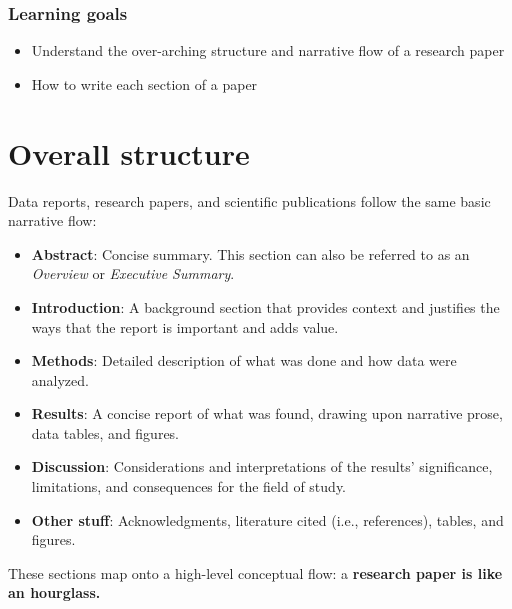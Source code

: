 \documentclass[]{book}
\providecommand{\tightlist}{%
  \setlength{\itemsep}{0pt}\setlength{\parskip}{0pt}}
\begin{document}
\hypertarget{learning-goals-26}{%
\subsubsection*{Learning goals}\label{learning-goals-26}}

\begin{itemize}
\tightlist
\item
  Understand the over-arching structure and narrative flow of a research paper\\
\item
  How to write each section of a paper
\end{itemize}

\hypertarget{overall-structure}{%
\section*{Overall structure}\label{overall-structure}}

Data reports, research papers, and scientific publications follow the same basic narrative flow:

\begin{itemize}
\tightlist
\item
  \textbf{Abstract}: Concise summary. This section can also be referred to as an \emph{Overview} or \emph{Executive Summary}.
\item
  \textbf{Introduction}: A background section that provides context and justifies the ways that the report is important and adds value.\\
\item
  \textbf{Methods}: Detailed description of what was done and how data were analyzed.\\
\item
  \textbf{Results}: A concise report of what was found, drawing upon narrative prose, data tables, and figures.
\item
  \textbf{Discussion}: Considerations and interpretations of the results' significance, limitations, and consequences for the field of study.
\item
  \textbf{Other stuff}: Acknowledgments, literature cited (i.e., references), tables, and figures.
\end{itemize}

These sections map onto a high-level conceptual flow: a \textbf{research paper is like an hourglass.}
\end{document}
